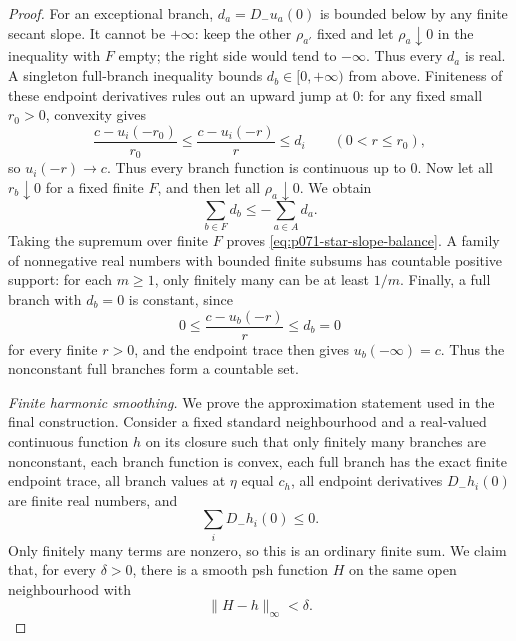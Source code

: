 \begin{proof}
For an exceptional branch, \(d_a=D_-u_a(0)\) is bounded below by any
finite secant slope.  It cannot be \(+\infty\): keep the other
\(\rho_{a'}\) fixed and let \(\rho_a\downarrow0\) in the inequality with
\(F\) empty; the right side would tend to \(-\infty\).  Thus every
\(d_a\) is real.  A singleton full-branch inequality bounds
\(d_b\in[0,+\infty)\) from above.  Finiteness of these endpoint
derivatives rules out an upward jump at \(0\): for any fixed small
\(r_0>0\), convexity gives
\[
 \frac{c-u_i(-r_0)}{r_0}
   \leq \frac{c-u_i(-r)}r
   \leq d_i\qquad(0<r\leq r_0),
\]
so \(u_i(-r)\to c\).  Thus every branch function is continuous up to
\(0\).  Now let all \(r_b\downarrow0\) for a
fixed finite \(F\), and then let all \(\rho_a\downarrow0\).  We obtain
\begin{equation}
                   \sum_{b\in F}d_b
                       \leq-\sum_{a\in A}d_a.
 \label{eq:p071-star-finite-slope-bound}
\end{equation}
Taking the supremum over finite \(F\) proves
\eqref{eq:p071-star-slope-balance}.  A family of nonnegative real numbers
with bounded finite subsums has countable positive support: for each
\(m\geq1\), only finitely many can be at least \(1/m\).  Finally, a full
branch with \(d_b=0\) is constant, since
\[
             0\leq\frac{c-u_b(-r)}r\leq d_b=0
\]
for every finite \(r>0\), and the endpoint trace then gives
\(u_b(-\infty)=c\).  Thus the nonconstant full branches form a countable
set.

\medskip\noindent
\emph{Finite harmonic smoothing.}
We prove the approximation statement used in the final construction.
Consider a fixed standard neighbourhood and a real-valued continuous
function \(h\) on its closure such that only finitely many branches are
nonconstant, each branch function is convex, each full branch has the
exact finite endpoint trace, all branch values at \(\eta\) equal \(c_h\),
all endpoint derivatives \(D_-h_i(0)\) are finite real numbers, and
\begin{equation}
                        \sum_iD_-h_i(0)\leq0.
 \label{eq:p071-star-smoothing-input-balance}
\end{equation}
Only finitely many terms are nonzero, so this is an ordinary finite
sum.  We claim that, for every \(\delta>0\), there is a
smooth psh function \(H\) on the same open neighbourhood with
\begin{equation}
                         \lVert H-h\rVert_\infty<\delta.
 \label{eq:p071-star-finite-smoothing-error}
\end{equation}


\end{proof}
